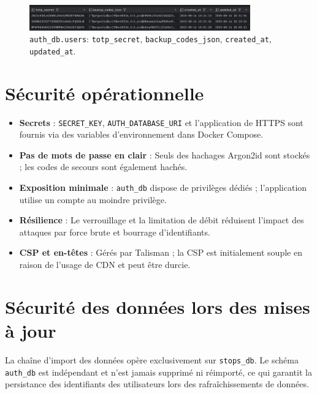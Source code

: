 \begin{itemize}
\begin{figure}[H]
  \centering
  \includegraphics[width=0.85\textwidth]{../figures/chap10/auth_db3.png}
  \caption{\texttt{auth\_db.users}: \texttt{totp\_secret}, \texttt{backup\_codes\_json}, \texttt{created\_at}, \texttt{updated\_at}.}
\end{figure}

\section{Sécurité opérationnelle}
\begin{itemize}
  \item \textbf{Secrets} : \texttt{SECRET\_KEY}, \texttt{AUTH\_DATABASE\_URI} et l'application de HTTPS sont fournis via des variables d'environnement dans Docker Compose.
  \item \textbf{Pas de mots de passe en clair} : Seuls des hachages Argon2id sont stockés ; les codes de secours sont également hachés.
  \item \textbf{Exposition minimale} : \texttt{auth\_db} dispose de privilèges dédiés ; l'application utilise un compte au moindre privilège.
  \item \textbf{Résilience} : Le verrouillage et la limitation de débit réduisent l'impact des attaques par force brute et bourrage d'identifiants.
  \item \textbf{CSP et en-têtes} : Gérés par Talisman ; la CSP est initialement souple en raison de l'usage de CDN et peut être durcie.
\end{itemize}

\section{Sécurité des données lors des mises à jour}
La chaîne d'import des données opère exclusivement sur \texttt{stops\_db}. Le schéma \texttt{auth\_db} est indépendant et n'est jamais supprimé ni réimporté, ce qui garantit la persistance des identifiants des utilisateurs lors des rafraîchissements de données.


\end{itemize}
